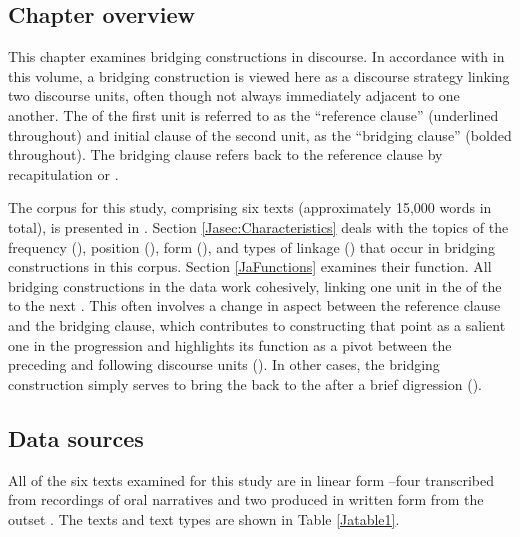 \documentclass[output=paper]{LSP/langsci}
\begin{document}
\subsection{Chapter overview}
This chapter examines bridging constructions in   discourse. In accordance with \citeauthor{guerin18} in this volume, a bridging construction is viewed here as a discourse  strategy linking two discourse units, often though not always immediately adjacent to one another. The  of the first unit is referred to as the ``reference clause'' (underlined throughout) and initial clause of the second unit, as the ``bridging clause'' (bolded throughout). The bridging clause refers back to the reference clause by recapitulation or .

The corpus for this study, comprising six  texts (approximately 15,000 words in total), is presented in . Section \ref{Jasec:Characteristics} deals with the topics of the frequency (), position (), form (), and types of linkage () that occur in bridging constructions in this corpus. Section \ref{JaFunctions} examines their function. All bridging constructions in the data work cohesively, linking one unit in the  of the  to the next \citep[][14--17]{longacre83}. This often involves a change in aspect between the reference clause and the bridging clause, which contributes to constructing that point as a salient one in the  progression and highlights its function as a pivot between the preceding and following discourse units (). In other cases, the bridging construction simply serves to bring the  back to the  after a brief digression ().
%
%
\subsection{Data sources}
\label{JaData}
All of the six  texts examined for this study are in linear  form --four transcribed from recordings of oral narratives 
\citep{fuller85,johnson92} and two produced in written form from the outset \citep{vang90}. The texts and text types are shown in Table \ref{Jatable1}. 
\end{document}
